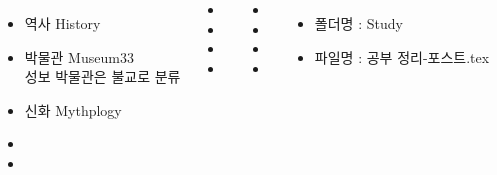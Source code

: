 \documentclass[	20pt, 
							a1paper, 
							landscape,
							margin=0mm, %
							innermargin=10mm,  		%
							blockverticalspace=4mm, %
							colspace=5mm, 
							subcolspace=0mm
							]{tikzposter}
\begin{document}
\begin{columns}

			{
					\begin{itemize}
					\item 	역사    History
					\item 	박물관 Museum33 \\
							성보 박물관은 불교로 분류
					\item 	신화    Mythplogy
					\item 
					\item 
					\end{itemize}
			} %







			{
				\begin{LARGE}
					\begin{itemize}
					\item 
					\item 
					\item 
					\item 
					\end{itemize}
				\end{LARGE}
			} %

			{
				\begin{LARGE}
					\begin{itemize}
					\item 
					\item 
					\item 
					\item 
					\end{itemize}
				\end{LARGE}
			} %


			{
					\begin{itemize}
					\item 폴더명 : Study
					\item 파일명 : 공부 정리-포스트.tex
					\end{itemize}
			}






	\end{columns}
\end{document}
